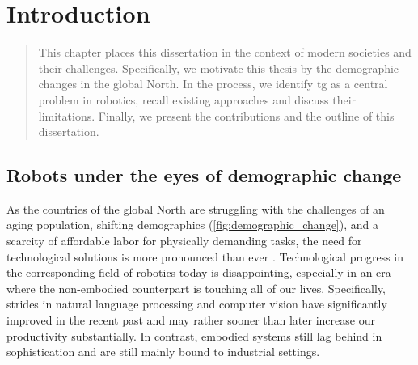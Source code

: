 \chapter{Introduction} %
\label{cha:intro}


\begin{abstract}
This chapter places this dissertation in the context of
modern societies and their challenges. Specifically, we
motivate this thesis by the demographic changes in the
global North. In the process, we identify
\acl{tg} as a central problem in robotics, recall existing
approaches and discuss their limitations. Finally, we
present the contributions and the outline of this
dissertation.
\end{abstract}

\newpage


\section{Robots under the eyes of demographic change}

As the countries of the global North are struggling with the
challenges of an aging population, shifting demographics
(\cref{fig:demographic_change}), and a scarcity of
affordable labor for physically demanding tasks, the need
for technological solutions is more pronounced than ever
\cite{ince2015economic}. Technological progress in the
corresponding field of robotics today is disappointing,
especially in an era where the non-embodied counterpart is
touching all of our lives. Specifically, strides in natural
language processing and computer vision have significantly
improved in the recent past and may rather sooner than later
increase our productivity substantially. In contrast, 
embodied systems still lag behind in
sophistication and are still mainly bound to industrial
settings.

